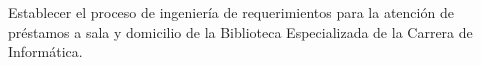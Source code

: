 Establecer el proceso de ingeniería de requerimientos para la atención de préstamos a sala y domicilio de la Biblioteca Especializada de la Carrera de Informática.
